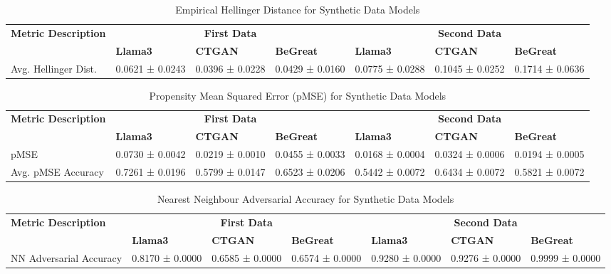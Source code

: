 \begin{table}[H]
    \centering
    \caption{Empirical Hellinger Distance for Synthetic Data Models}
    \label{tab:hellinger_distance_combined}
    \begin{tabularx}{\textwidth}{l*{6}{X}}
        \toprule
        \textbf{Metric Description} & \multicolumn{3}{c}{\textbf{First Data}} & \multicolumn{3}{c}{\textbf{Second Data}} \\
        \cmidrule(lr){2-4} \cmidrule(lr){5-7}
        & \textbf{Llama3} & \textbf{CTGAN} & \textbf{BeGreat} & \textbf{Llama3} & \textbf{CTGAN} & \textbf{BeGreat} \\
        \midrule
        Avg. Hellinger Dist. & 0.0621 ± 0.0243 & 0.0396 ± 0.0228 & 0.0429 ± 0.0160 & 0.0775 ± 0.0288 & 0.1045 ± 0.0252 & 0.1714 ± 0.0636 \\
        \bottomrule
    \end{tabularx}
\end{table}
    


\begin{table}[H]
    \centering
    \caption{Propensity Mean Squared Error (pMSE) for Synthetic Data Models}
    \label{tab:pmse_combined}
    \begin{tabularx}{\textwidth}{l*{6}{X}}
        \toprule
        \textbf{Metric Description} & \multicolumn{3}{c}{\textbf{First Data}} & \multicolumn{3}{c}{\textbf{Second Data}} \\
        \cmidrule(lr){2-4} \cmidrule(lr){5-7}
        & \textbf{Llama3} & \textbf{CTGAN} & \textbf{BeGreat} & \textbf{Llama3} & \textbf{CTGAN} & \textbf{BeGreat} \\
        \midrule
        pMSE & 0.0730 ± 0.0042 & 0.0219 ± 0.0010 & 0.0455 ± 0.0033 & 0.0168 ± 0.0004 & 0.0324 ± 0.0006 & 0.0194 ± 0.0005 \\
        Avg. pMSE Accuracy & 0.7261 ± 0.0196 & 0.5799 ± 0.0147 & 0.6523 ± 0.0206 & 0.5442 ± 0.0072 & 0.6434 ± 0.0072 & 0.5821 ± 0.0072 \\
        \bottomrule
    \end{tabularx}
\end{table}


\begin{table}[H]
    \centering
    \caption{Nearest Neighbour Adversarial Accuracy for Synthetic Data Models}
    \label{tab:nn_accuracy_combined}
    \begin{tabularx}{\textwidth}{l*{6}{X}}
        \toprule
        \textbf{Metric Description} & \multicolumn{3}{c}{\textbf{First Data}} & \multicolumn{3}{c}{\textbf{Second Data}} \\
        \cmidrule(lr){2-4} \cmidrule(lr){5-7}
        & \textbf{Llama3} & \textbf{CTGAN} & \textbf{BeGreat} & \textbf{Llama3} & \textbf{CTGAN} & \textbf{BeGreat} \\
        \midrule
        NN Adversarial Accuracy & 0.8170 ± 0.0000 & 0.6585 ± 0.0000 & 0.6574 ± 0.0000 & 0.9280 ± 0.0000 & 0.9276 ± 0.0000 & 0.9999 ± 0.0000 \\
        \bottomrule
    \end{tabularx}
\end{table}



